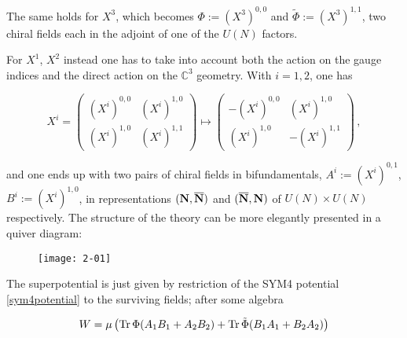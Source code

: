 The same holds for $X^3$, which becomes $\Phi := (X^3)^{0,0}$ and $\tilde \Phi := (X^3)^{1,1}$, two chiral fields each in the adjoint of one of the $U(N)$ factors.

For $X^1$, $X^2$ instead one has to take into account both the action on the gauge indices and the direct action on the $\mathbb{C}^3$ geometry. With $i=1,2$, one has

\begin{equation}
	X^i = \begin{pmatrix} 
			(X^i)^{0,0} & (X^i)^{1,0} \\
			(X^i)^{1,0} & (X^i)^{1,1} 
		\end{pmatrix}\mapsto \begin{pmatrix} 
			-(X^i)^{0,0} & (X^i)^{1,0} \\
			(X^i)^{1,0} & -(X^i)^{1,1} 
		\end{pmatrix}\,,
\end{equation}

and one ends up with two pairs of chiral fields in bifundamentals, $A^i := (X^i)^{0,1}$, $B^i := (X^i)^{1,0}$, in representations $(\mathbf{N}, \overline{\mathbf{N}})$ and $(\overline{\mathbf{N}}, \mathbf{N})$ of $U(N)\times U(N)$ respectively. The structure of the theory can be more elegantly presented in a quiver diagram:

\begin{figure}[H]
	\centering
	\texttt{[image: 2-01]}
\end{figure}

The superpotential is just given by restriction of the SYM4 potential \eqref{sym4potential} to the surviving fields; after some algebra

\begin{equation}
	W = \mu \left( \operatorname{Tr} \Phi (A_1 B_1 + A_2 B_2 ) + \operatorname{Tr} \tilde\Phi (B_1 A_1 + B_2 A_2) \right)
	\label{}
\end{equation}

